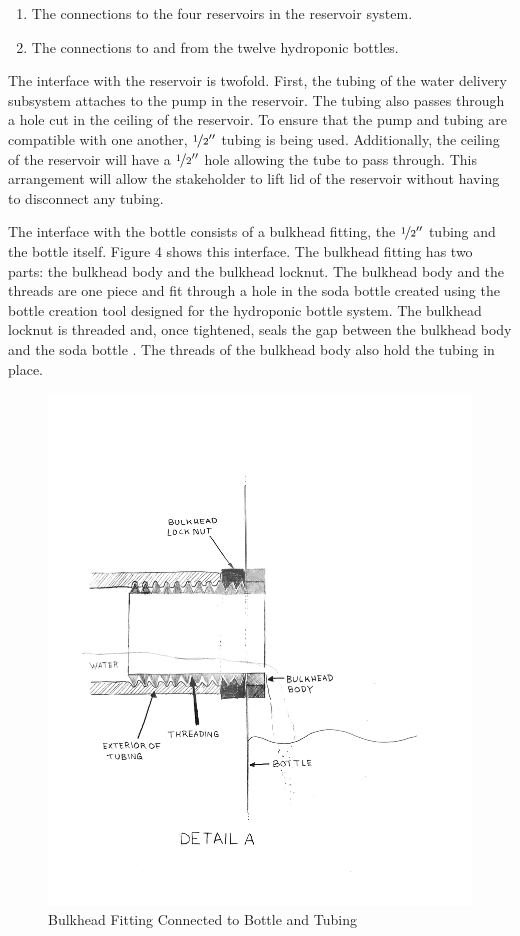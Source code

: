 \documentclass[12pt]{article}
\begin{document}
\begin{enumerate}
    \item The connections to the four reservoirs in the reservoir system.
    \item The connections to and from the twelve hydroponic bottles.
\end{enumerate}

The interface with the reservoir is twofold. First, the tubing of the water delivery subsystem
attaches to the pump in the reservoir. The tubing also passes through a hole cut in the ceiling of
the reservoir. To ensure that the pump and tubing are compatible with one another,
$\nicefrac{1}{2}''$ tubing is being used. Additionally, the ceiling of the reservoir will have a
$\nicefrac{1}{2}''$ hole allowing the tube to pass through. This arrangement will allow the
stakeholder to lift lid of the reservoir without having to disconnect any tubing.

The interface with the bottle consists of a bulkhead fitting, the $\nicefrac{1}{2}''$ tubing and the
bottle itself. Figure 4 shows this interface. The bulkhead fitting has two parts: the bulkhead
body and the bulkhead locknut. The bulkhead body and the threads are one piece and fit through a
hole in the soda bottle created using the bottle creation tool designed for the hydroponic bottle
system. The bulkhead locknut is threaded and, once tightened, seals the gap between the bulkhead
body and the soda bottle \cite{uspc}. The threads of the bulkhead body also hold the tubing in
place.

\begin{figure}[H]
    \centering
    \includegraphics[width=163mm]{resources/detail-a.png}
    \caption{Bulkhead Fitting Connected to Bottle and Tubing}
\end{figure}
\end{document}
